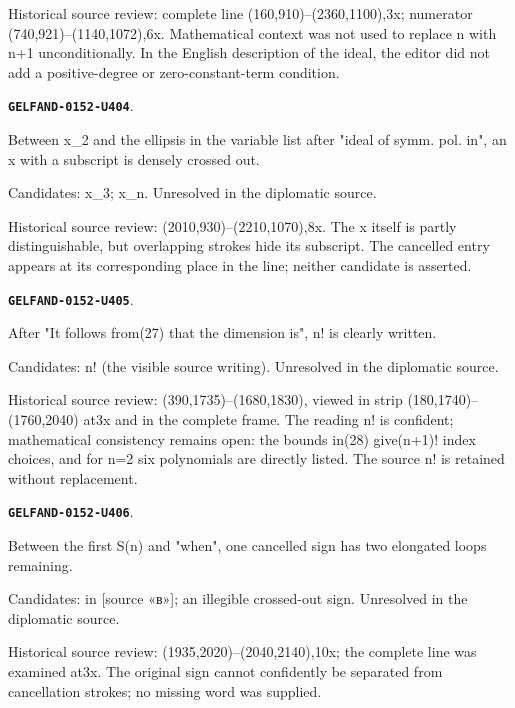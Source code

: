 \documentclass[11pt]{article}
\theoremstyle{definition}
\theoremstyle{remark}
\begin{document}
Historical source review: complete line (160,910)–(2360,1100),3x; numerator (740,921)–(1140,1072),6x. Mathematical context was not used to replace n with n+1 unconditionally. In the English description of the ideal, the editor did not add a positive-degree or zero-constant-term condition.\par\medskip
\par\noindent\leavevmode{}\label{GELFAND-0152-U404}\label{GELFAND-P001404:finite26-cancelled:note}\textbf{\texttt{GELFAND-0152-U404}}.\nopagebreak[4]\par
Between x\_2 and the ellipsis in the variable list after "ideal of symm. pol. in", an x with a subscript is densely crossed out.\par
Candidates: x\_3; x\_n. Unresolved in the diplomatic source.\par
Historical source review: (2010,930)–(2210,1070),8x. The x itself is partly distinguishable, but overlapping strokes hide its subscript. The cancelled entry appears at its corresponding place in the line; neither candidate is asserted.\par\medskip
\par\noindent\leavevmode{}\label{GELFAND-0152-U405}\label{GELFAND-P001404:dimension-factorial:note}\textbf{\texttt{GELFAND-0152-U405}}.\nopagebreak[4]\par
After "It follows from(27) that the dimension is", n! is clearly written.\par
Candidates: n! (the visible source writing). Unresolved in the diplomatic source.\par
Historical source review: (390,1735)–(1680,1830), viewed in strip (180,1740)–(1760,2040) at3x and in the complete frame. The reading n! is confident; mathematical consistency remains open: the bounds in(28) give(n+1)! index choices, and for n=2 six polynomials are directly listed. The source n! is retained without replacement.\par\medskip
\par\noindent\leavevmode{}\label{GELFAND-0152-U406}\label{GELFAND-P001404:question30-cancelled:note}\textbf{\texttt{GELFAND-0152-U406}}.\nopagebreak[4]\par
Between the first S(n) and "when", one cancelled sign has two elongated loops remaining.\par
Candidates: in [source «в»]; an illegible crossed-out sign. Unresolved in the diplomatic source.\par
Historical source review: (1935,2020)–(2040,2140),10x; the complete line was examined at3x. The original sign cannot confidently be separated from cancellation strokes; no missing word was supplied.\par\medskip
\end{document}
